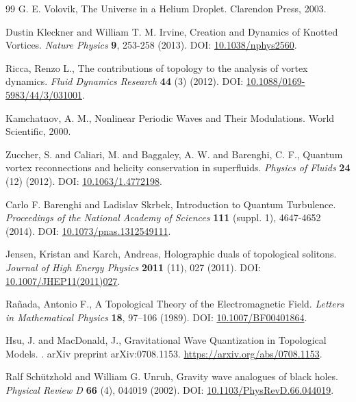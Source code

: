 \documentclass[a4paper, aps,preprint,superscriptaddress, 12pt]{revtex4}
\begin{document}
\begin{thebibliography}{99}
G. E. Volovik,
\newblock The Universe in a Helium Droplet.
\newblock Clarendon Press, 2003.


Dustin Kleckner and William T. M. Irvine,
\newblock Creation and Dynamics of Knotted Vortices.
\textit{Nature Physics} \textbf{9}, 253-258 (2013).
\newblock DOI: \href{https://doi.org/10.1038/nphys2560}{10.1038/nphys2560}.


Ricca, Renzo L.,
\newblock The contributions of topology to the analysis of vortex dynamics.
\textit{Fluid Dynamics Research} \textbf{44} (3) (2012).
\newblock DOI: \href{https://doi.org/10.1088/0169-5983/44/3/031001}{10.1088/0169-5983/44/3/031001}.


Kamchatnov, A. M.,
\newblock Nonlinear Periodic Waves and Their Modulations.
\newblock World Scientific, 2000.


Zuccher, S. and Caliari, M. and Baggaley, A. W. and Barenghi, C. F.,
\newblock Quantum vortex reconnections and helicity conservation in superfluids.
\textit{Physics of Fluids} \textbf{24} (12) (2012).
\newblock DOI: \href{https://doi.org/10.1063/1.4772198}{10.1063/1.4772198}.


Carlo F. Barenghi and Ladislav Skrbek,
\newblock Introduction to Quantum Turbulence.
\textit{Proceedings of the National Academy of Sciences} \textbf{111} (suppl. 1), 4647-4652 (2014).
\newblock DOI: \href{https://doi.org/10.1073/pnas.1312549111}{10.1073/pnas.1312549111}.


Jensen, Kristan and Karch, Andreas,
\newblock Holographic duals of topological solitons.
\textit{Journal of High Energy Physics} \textbf{2011} (11), 027 (2011).
\newblock DOI: \href{https://doi.org/10.1007/JHEP11(2011)027}{10.1007/JHEP11(2011)027}.


Ra\~nada, Antonio F.,
\newblock A Topological Theory of the Electromagnetic Field.
\textit{Letters in Mathematical Physics} \textbf{18}, 97--106 (1989).
\newblock DOI: \href{https://doi.org/10.1007/BF00401864}{10.1007/BF00401864}.


Hsu, J. and MacDonald, J.,
\newblock Gravitational Wave Quantization in Topological Models.
.
\newblock arXiv preprint arXiv:0708.1153.
\newblock \url{https://arxiv.org/abs/0708.1153}.


Ralf Schützhold and William G. Unruh,
\newblock Gravity wave analogues of black holes.
\textit{Physical Review D} \textbf{66} (4), 044019 (2002).
\newblock DOI: \href{https://doi.org/10.1103/PhysRevD.66.044019}{10.1103/PhysRevD.66.044019}.



\end{thebibliography}
\end{document}
